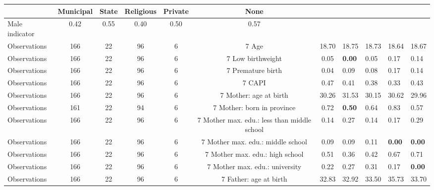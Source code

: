 \begin{tabular}{l c c c c c c }
\toprule
& \textbf{Municipal} & \textbf{State} & \textbf{Religious} & \textbf{Private} & \textbf{None} \\
\midrule
Male indicator &      0.42 &      0.55 &      0.40 &      0.50 &      0.57 \\
\midrule
Observations &       166 &        22 &        96 &         6 &         7
Age &     18.70 &     18.75 &     18.73 &     18.64 &     18.67 \\
\midrule
Observations &       166 &        22 &        96 &         6 &         7
Low birthweight &      0.05 & \textbf{     0.00} &      0.05 &      0.17 &      0.14 \\
\midrule
Observations &       166 &        22 &        96 &         6 &         7
Premature birth &      0.04 &      0.09 &      0.08 &      0.17 &      0.14 \\
\midrule
Observations &       166 &        22 &        96 &         6 &         7
CAPI &      0.47 &      0.41 &      0.38 &      0.33 &      0.43 \\
\midrule
Observations &       166 &        22 &        96 &         6 &         7
Mother: age at birth &     30.26 &     31.53 &     30.15 &     30.62 &     29.96 \\
\midrule
Observations &       161 &        22 &        94 &         6 &         7
Mother: born in province &      0.72 & \textbf{     0.50} &      0.64 &      0.83 &      0.57 \\
\midrule
Observations &       166 &        22 &        96 &         6 &         7
Mother max. edu.: less than middle school &      0.14 &      0.27 &      0.14 &      0.17 &      0.29 \\
\midrule
Observations &       166 &        22 &        96 &         6 &         7
Mother max. edu.: middle school &      0.09 &      0.09 &      0.11 & \textbf{     0.00} & \textbf{     0.00} \\
\midrule
Observations &       166 &        22 &        96 &         6 &         7
Mother max. edu.: high school &      0.51 &      0.36 &      0.42 &      0.67 &      0.71 \\
\midrule
Observations &       166 &        22 &        96 &         6 &         7
Mother max. edu.: university &      0.22 &      0.27 &      0.31 &      0.17 & \textbf{     0.00} \\
\midrule
Observations &       166 &        22 &        96 &         6 &         7
Father: age at birth &     32.83 &     32.92 &     33.50 &     35.73 &     33.70 \\

\end{tabular}
